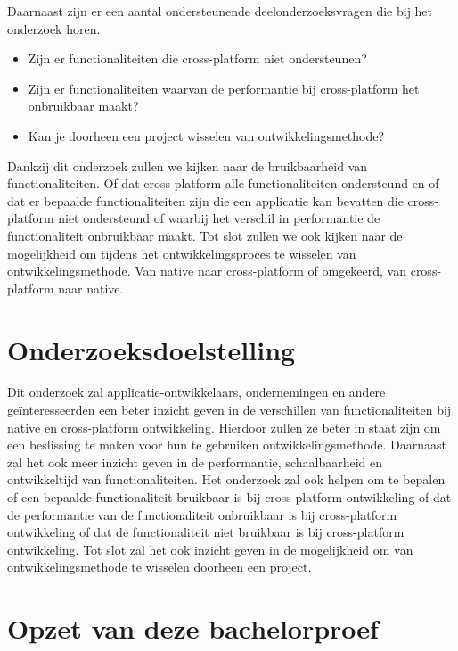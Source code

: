 Daarnaast zijn er een aantal ondersteunende deelonderzoeksvragen die bij het onderzoek horen.

\begin{itemize}
    \item Zijn er functionaliteiten die cross-platform niet ondersteunen?
    \item Zijn er functionaliteiten waarvan de performantie bij cross-platform het onbruikbaar maakt?
    \item Kan je doorheen een project wisselen van ontwikkelingsmethode?
\end{itemize}

Dankzij dit onderzoek zullen we kijken naar de bruikbaarheid van functionaliteiten. 
Of dat cross-platform alle functionaliteiten ondersteund en of dat er bepaalde functionaliteiten zijn die een applicatie kan bevatten 
die cross-platform niet ondersteund of waarbij het verschil in performantie de functionaliteit onbruikbaar maakt. 
Tot slot zullen we ook kijken naar de mogelijkheid om tijdens het ontwikkelingsproces te wisselen van ontwikkelingsmethode. 
Van native naar cross-platform of omgekeerd, van cross-platform naar native.

\section{Onderzoeksdoelstelling}%
\label{sec:onderzoeksdoelstelling}

Dit onderzoek zal applicatie-ontwikkelaars, ondernemingen en andere geïnteresseerden een beter inzicht geven in de verschillen van functionaliteiten 
bij native en cross-platform ontwikkeling. Hierdoor zullen ze beter in staat zijn om een beslissing te maken voor hun te gebruiken ontwikkelingsmethode. 
Daarnaast zal het ook meer inzicht geven in de performantie, schaalbaarheid en ontwikkeltijd van functionaliteiten. 
Het onderzoek zal ook helpen om te bepalen of een bepaalde functionaliteit bruikbaar is bij cross-platform ontwikkeling of dat de 
performantie van de functionaliteit onbruikbaar is bij cross-platform ontwikkeling of dat de functionaliteit niet bruikbaar is bij cross-platform ontwikkeling. 
Tot slot zal het ook inzicht geven in de mogelijkheid om van ontwikkelingsmethode te wisselen doorheen een project.

\section{Opzet van deze bachelorproef}%
\label{sec:opzet-bachelorproef}


